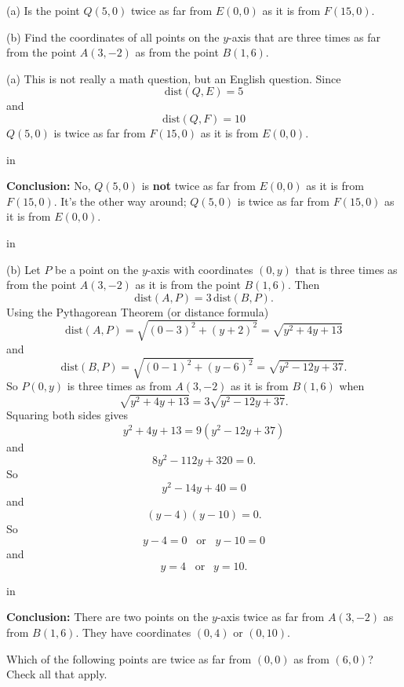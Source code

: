 \documentclass{ximera}
\newcommand{\pskip}{\vskip 0.1 in}
\begin{document}
\begin{example}
(a) Is the point $Q(5,0)$ twice as far from $E(0,0)$ as it is from $F(15,0)$.

(b) Find the coordinates of all points on the $y$-axis that are three times as far from the point $A(3,-2)$ as from the point $B(1,6)$. %
\end{example}

\begin{explanation}
(a) This is not really a math question, but an English question. Since
\[
    \text{dist}(Q,E) = 5
\]
and 
\[
    \text{dist}(Q,F) = 10  %
\]
$Q(5,0)$ is twice as far from $F(15,0)$ as it is from $E(0,0)$.

\pskip

{\bf Conclusion:} No, $Q(5,0)$ is {\bf not} twice as far from $E(0,0)$ as it is from $F(15,0)$. It's the other way around; $Q(5,0)$ is twice as far from $F(15,0)$ as it is from $E(0,0)$. 

\pskip

(b) Let $P$ be a point on the $y$-axis with coordinates $(0,y)$ that is three times as  from the point $A(3,-2)$ as it is from the point $B(1,6)$. Then
\[
    \text{dist}(A,P) = 3 \, \text{dist}(B,P) .
\]
Using the Pythagorean Theorem (or distance formula)
\[
    \text{dist}(A,P) = \sqrt{(0-3)^2 + (y+2)^2} = \sqrt{y^2 + 4y + 13}
\]
and
\[
    \text{dist}(B,P) = \sqrt{(0-1)^2 + (y-6)^2} = \sqrt{y^2-12y+37}.
\]
So $P(0,y)$ is  three times as  from $A(3,-2)$ as it is from $B(1,6)$ when
\[
   \sqrt{y^2 + 4y + 13} = 3 \sqrt{y^2-12y+37} .
\]
Squaring both sides gives
\[
  y^2 + 4y + 13 = 9(y^2-12y+37)
\]
and 
\[
        8y^2 - 112y +320 = 0 .
\]
So
\[
     y^2 - 14y + 40 = 0
\]
and
\[
     (y -4 )(y - 10) = 0.
\]
So
\[
     y-4 = 0    \;\;\;  \text{or} \;\;\; y-10=0
\]
and
\[
    y=4  \;\; \; \text{or} \;\;\ y=10 .
\]

\pskip

{\bf Conclusion:} There are two points on the $y$-axis twice as far from $A(3,-2)$ as from $B(1,6)$. They have coordinates $(0,4)$ or $(0,10)$.

\end{explanation}


\begin{exercise}  
  Which of the following points are twice as far from $(0,0)$ as from $(6,0)$? Check all that apply.  
  \begin{selectAll}  
     \end{selectAll}  
\end{exercise}  
\end{document}
